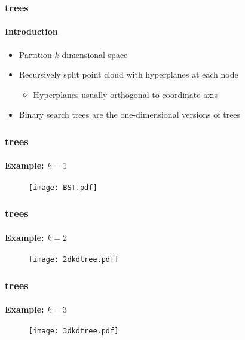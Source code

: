 

\begin{frame}
  \frametitle{\kd trees}
  \framesubtitle{Introduction}

  \begin{itemize}
    \item Partition $k$-dimensional space
    \item Recursively split point cloud with hyperplanes at each node
      \begin{itemize}
        \item Hyperplanes usually orthogonal to coordinate axis
      \end{itemize}
    \item Binary search trees are the one-dimensional versions of \kd trees
  \end{itemize}
\end{frame}

\begin{frame}
  \frametitle{\kd trees}
  \framesubtitle{Example: $k=1$}

  \begin{figure}
    \centering
    \texttt{[image: BST.pdf]}
  \end{figure}
  
\end{frame}

\begin{frame}
  \frametitle{\kd trees}
  \framesubtitle{Example: $k=2$}
  
  \begin{figure}
    \centering
    \texttt{[image: 2dkdtree.pdf]}
  \end{figure}

\end{frame}

\begin{frame}
  \frametitle{\kd trees}
  \framesubtitle{Example: $k=3$}
  
  \begin{figure}
    \centering
    \texttt{[image: 3dkdtree.pdf]}
  \end{figure}

\end{frame}

